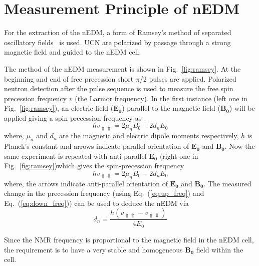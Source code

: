 \section{Measurement Principle of nEDM}\label{sec:nEDM}

For the extraction of the nEDM, a form of Ramsey's method of separated oscillatory fields~\cite{ramsey} is used. UCN are polarized by passage through a strong magnetic field and guided to the nEDM cell. 



The method of the nEDM measurement is shown in Fig.~\ref{fig:ramsey}. At the beginning and end of free precession short $\pi$/2 pulses are applied. Polarized neutron detection after the pulse sequence is used to measure the free spin precession frequency $v$ (the Larmor frequency). In the first instance (left one in Fig.~\ref{fig:ramsey}), an electric field ($\bm{E_0}$) parallel to the magnetic field ($\bm{B_0}$) will be applied giving a spin-precession frequency as
\begin{equation}\label{eq:up_freq}
    h v_{\Uparrow \Uparrow}=2\mu_n B_0+2 d_n E_0
\end{equation}
where, $\mu_n$ and $d_n$ are the magnetic and electric dipole moments respectively, $h$ is Planck's constant and arrows indicate parallel orientation of $\bm{E_0}$ and $\bm{B_0}$.
Now the same experiment is repeated with anti-parallel $\bm{E_0}$ (right one in Fig.~\ref{fig:ramsey})which gives the spin-precession frequency
\begin{equation}\label{eq:down_freq}
    h v_{\Uparrow \Downarrow}=2\mu_n B_0-2 d_n E_0
\end{equation}
where, the arrows indicate anti-parallel orientation of $\bm{E_0}$ and $\bm{B_0}$.
The measured change in the precession frequency (using Eq.~(\ref{eq:up_freq}) and Eq.~(\ref{eq:down_freq})) can be used to deduce the nEDM via
\begin{equation}\label{eq:nEDM}
    d_n=\frac{h (v_{\Uparrow \Uparrow}-v_{\Uparrow \Downarrow})}{4 E_0}
\end{equation}

Since the NMR frequency is proportional to the magnetic field in the nEDM cell, the requirement is to have a very stable and homogeneous $\bm{B_0}$ field within the cell.



